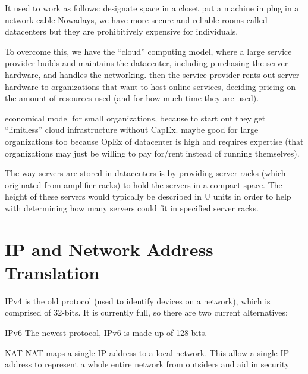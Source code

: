\documentclass[fancy,11pt,titlestyle=display]{style/elegantbook}
\begin{document}
It used to work as follows:
designate space in a closet
put a machine in
plug in a network cable
Nowadays, we have more secure and reliable rooms called datacenters
but they are prohibitively expensive for individuals.

To overcome this, we have the ``cloud'' computing model, where a large service provider builds and maintains the datacenter, including purchasing the server hardware, and handles the networking.  then the service provider rents out server hardware to organizations that want to host online services, deciding pricing on the amount of resources used (and for how much time they are used).

economical model for small organizations, because to start out they get ``limitless'' cloud infrastructure without CapEx.  maybe good for large organizations too because OpEx of datacenter is high and requires expertise (that organizations may just be willing to pay for/rent instead of running themselves).

The way servers are stored in datacenters is by providing server racks (which originated from amplifier racks) to hold the servers in a compact space. The height of these servers would typically be described in U units in order to help with determining how many servers could fit in specified server racks.

\section{IP and Network Address Translation}

IPv4 is the old protocol (used to identify devices on a network), which is comprised of 32-bits. It is currently full, so there are two current alternatives:

\begin{definition}{IPv6}{}
The newest protocol, IPv6 is made up of 128-bits.
\end{definition}

\begin{definition}{NAT}{}
NAT maps a single IP address to a local network. This allow a single IP address to represent a whole entire network from outsiders and aid in security
\end{definition}
\end{document}
